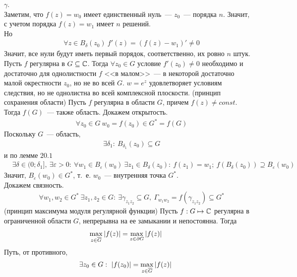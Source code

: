 $\gamma$. 
\\
Заметим, что $f(z) = w_0$ имеет единственный нуль~--- $z_0$~--- порядка $n$.
Значит, с учетом порядка $f(z) = w_1$ имеет $n$ решений.
\\
Но 
\begin{align*}
& \forall z \in B_\delta(z_0) \ f'(z) = (f(z)-w_1)' \neq 0
\end{align*}
Значит, все нули будут иметь первый порядок, соответственно, их ровно $n$ штук.
\corollary
Пусть $f$ регулярна в $G \subseteq \mathbb{C}$. Тогда $\forall z_0 \in G$ условие
$f'(z_0) \neq 0$ необходимо и достаточно для однолистности $f$ <<в малом>>~--- в
некоторой достаточно малой окрестности $z_0$, но не во всей $G$.
\Example
$w=e^z$ удовлетворяет условиям следствия, но не однолистна во всей комплексной
плоскости.
\theorem (принцип сохранения области)
Пусть $f$ регулярна в области $G$, причем $f(z) \neq const$. Тогда $f(G)$~---
также область.
\pr
Докажем открытость.
\begin{align*}
& \forall z_0 \in G \ w_0 = f(z_0) \in G^* = f(G)
\end{align*}
Поскольку $G$~--- область, 
\begin{align*}
& \exists \delta_1: \ B_{\delta_1}(z_0) \subseteq G
\end{align*}
и по лемме $20.1$
\begin{align*}
& \exists \delta \in (0; \delta_1], \ \exists \varepsilon > 0: \ \forall w_1 \in B_\varepsilon (w_0) \ \exists z_1 \in B_\delta(z_0): \ f(z_1) = w_1; \ f(B_\delta(z_0)) \supseteq B_\varepsilon(w_0)
\end{align*}
Значит, $B_\varepsilon(w_0)\in G^*$, т.~е. $w_0$~--- внутренняя точка $G^*$.
\\
Докажем связность.
\begin{align*}
  & \forall w_1, w_2 \in G^* \ \exists z_1,z_2 \in G: \ \exists \gamma_{z_1z_2} \subseteq G, \ \Gamma_{w_1w_2} = f(\gamma_{z_1z_2}) \subseteq G^*
\end{align*}
\theorem (принцип максимума модуля регулярной функции)
Пусть $f: G \mapsto \mathbb{C}$ регулярна в ограниченной области $G$, непрерывна на ее
замыкании и непостоянна. Тогда
\begin{align*}
  & \max_{z \in \overline{G}} \left| f(z) \right| = \max_{z \in \partial G} \left| f(z) \right|
\end{align*}
\pr
Путь, от противного,
\begin{align*}
  & \exists z_0 \in G: \ \left| f(z_0) \right| = \max_{z \in \overline{G}}\left| f(z) \right|
\end{align*}

